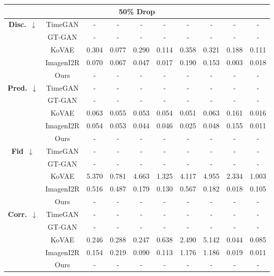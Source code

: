 \documentclass{article}
\theoremstyle{plain}
\theoremstyle{definition}
\theoremstyle{remark}
\begin{document}
\begin{table}[!t]
{\begin{tabular}{cc|cccccccc}
    \multicolumn{10}{c}{\textbf{50\% Drop}} \\
    \midrule
    \multirow{5}{*}{\textbf{Disc.}~$\downarrow$}
      & TimeGAN & - & - & - & - & - & - & - & - \\
      & GT-GAN  & - & - & - & - & - & - & - & - \\
      & KoVAE  & 0.304 & 0.077 & 0.290 & 0.114 & 0.358 & 0.321 & 0.188 & 0.111 \\
      & ImagenI2R   & 0.070
               & 0.067
               & 0.047
               & 0.017
               & 0.190
               & 0.153
               & 0.003
               & 0.018 \\
    & Ours
       & - & - & - & - & - & - & - & - \\
    \midrule
    \multirow{5}{*}{\textbf{Pred.}~$\downarrow$} 
      & TimeGAN & - & - & - & - & - & - & - & - \\
      & GT-GAN  & - & - & - & - & - & - & - & - \\
      & KoVAE  & 0.063 & 0.055 & 0.053 & 0.054 & 0.051 & 0.063 & 0.161 & 0.016 \\
      & ImagenI2R   & 0.054
               & 0.053
               & 0.044
               & 0.046
               & 0.025
               & 0.048
               & 0.155
               & 0.011 \\
    & Ours
       & - & - & - & - & - & - & - & - \\
    \midrule
    \multirow{5}{*}{\textbf{Fid}~$\downarrow$}     
      & TimeGAN & - & - & - & - & - & - & - & - \\
      & GT-GAN  & - & - & - & - & - & - & - & - \\
      & KoVAE  & 5.370 & 0.781 & 4.663 & 1.325 & 4.117 & 4.955 & 2.334 & 1.003 \\
      & ImagenI2R   & 0.516
               & 0.487
               & 0.179
               & 0.130
               & 0.567
               & 0.182
               & 0.018
               & 0.105 \\
    & Ours
       & - & - & - & - & - & - & - & - \\
    \midrule
    \multirow{5}{*}{\textbf{Corr.}~$\downarrow$}     
      & TimeGAN & - & - & - & - & - & - & - & - \\
      & GT-GAN  & - & - & - & - & - & - & - & - \\
      & KoVAE  & 0.246 & 0.288 & 0.247 & 0.638 & 2.490 & 5.142 & 0.044 & 0.085 \\
      & ImagenI2R   & 0.154
               & 0.219
               & 0.090
               & 0.113
               & 1.176
               & 1.186
               & 0.019
               & 0.011 \\
    & Ours
       & - & - & - & - & - & - & - & - \\
    \midrule


\end{tabular}}
\end{table}
\end{document}
